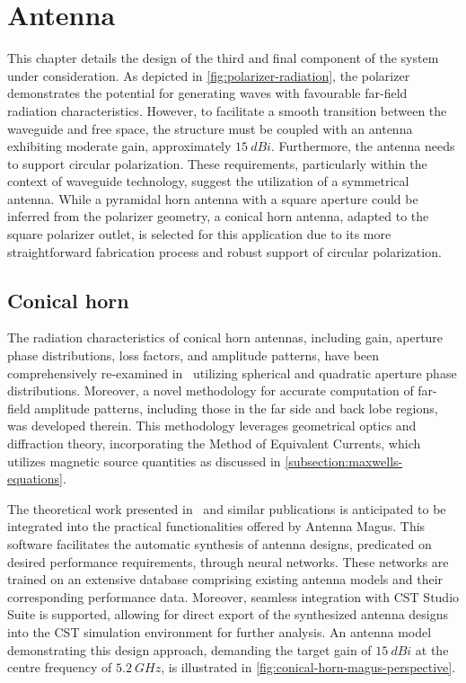 \documentclass[11pt,a4paper,twoside,openany]{report}
\begin{document}
\chapter{Antenna}
\label{chapter:antenna}
This chapter details the design of the third and final component of the system under consideration. As depicted in \cref{fig:polarizer-radiation}, the polarizer demonstrates the potential for generating waves with favourable far-field radiation characteristics. However, to facilitate a smooth transition between the waveguide and free space, the structure must be coupled with an antenna exhibiting moderate gain, approximately $\qty{15}{dBi}$. Furthermore, the antenna needs to support circular polarization. These requirements, particularly within the context of waveguide technology, suggest the utilization of a symmetrical antenna. While a pyramidal horn antenna with a square aperture could be inferred from the polarizer geometry, a conical horn antenna, adapted to the square polarizer outlet, is selected for this application due to its more straightforward fabrication process and robust support of circular polarization.

\section{Conical horn}
The radiation characteristics of conical horn antennas, including gain, aperture phase distributions, loss factors, and amplitude patterns, have been comprehensively re-examined in~\parencite{aboserwal-et-al:conical-horn-gain-and-amplitude-patterns} utilizing spherical and quadratic aperture phase distributions. Moreover, a novel methodology for accurate computation of far-field amplitude patterns, including those in the far side and back lobe regions, was developed therein. This methodology leverages geometrical optics and diffraction theory, incorporating the Method of Equivalent Currents, which utilizes magnetic source quantities as discussed in \cref{subsection:maxwells-equations}.

The theoretical work presented in~\parencite{aboserwal-et-al:conical-horn-gain-and-amplitude-patterns} and similar publications is anticipated to be integrated into the practical functionalities offered by Antenna Magus. This software facilitates the automatic synthesis of antenna designs, predicated on desired performance requirements, through neural networks. These networks are trained on an extensive database comprising existing antenna models and their corresponding performance data. Moreover, seamless integration with CST Studio Suite is supported, allowing for direct export of the synthesized antenna designs into the CST simulation environment for further analysis. An antenna model demonstrating this design approach, demanding the target gain of $\qty{15}{dBi}$ at the centre frequency of $\qty{5.2}{GHz}$, is illustrated in \cref{fig:conical-horn-magus-perspective}.
\end{document}
